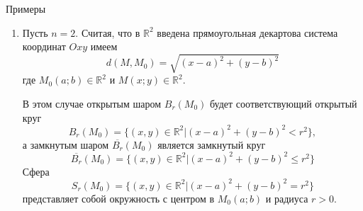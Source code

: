 \begin{statement}{Примеры}
\begin{enumerate}
\begin{center}
		\end{center}
		
		\item Пусть $n = 2$. Считая, что в $\mathbb{R}^2$ введена прямоугольная декартова система координат $Oxy$ имеем
		\begin{equation*}
			d(M, M_0) = \sqrt{(x-a)^2 + (y-b)^2}
		\end{equation*}
		где $M_0(a; b) \in \mathbb{R}^2$ и $M(x; y) \in \mathbb{R}^2$.
		
		В этом случае открытым шаром $B_r(M_0)$ будет соответствующий открытый круг
		\begin{equation*}
			B_r (M_0) = \{ (x, y) \in \mathbb{R}^2 | (x-a)^2 + (y-b)^2 < r^2 \},
		\end{equation*}
		а замкнутым шаром $\overline{B_r} (M_0)$ является замкнутый круг
		\begin{equation*}
		\overline{B_r} (M_0) = \{ (x, y) \in \mathbb{R}^2 | (x-a)^2 + (y-b)^2 \leqslant r^2 \}
		\end{equation*}
		Сфера
		\begin{equation*}
			S_r (M_0) = \{ (x, y) \in \mathbb{R}^2 | (x-a)^2 + (y-b)^2 = r^2 \}
		\end{equation*}
		представляет собой окружность с центром в $M_0(a; b)$ и радиуса $r > 0$.
		

\end{enumerate}
\end{statement}
